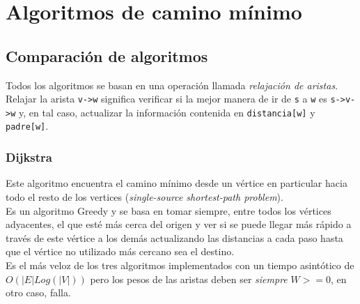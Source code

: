 \documentclass{article}
\def\code#1{\texttt{#1}}
\newcommand\tab[1][0.5cm]{\hspace*{#1}}
\begin{document}

    \newpage

    \section{Algoritmos de camino mínimo}
        \subsection{Comparación de algoritmos}
            \tab Todos los algoritmos se basan en una operación llamada \emph{relajación de aristas}. Relajar
        la arista \code{v->w} significa verificar si la mejor manera de ir de \code{s} a \code{w} es \code{s->v->w}
        y, en tal caso, actualizar la información contenida en \code{distancia[w]} y \code{padre[w]}.

            \subsubsection{Dijkstra}
            \tab Este algoritmo encuentra el camino mínimo desde un vértice en particular hacia todo
            el resto de los vertices (\emph{single-source shortest-path problem}). \\
            \tab Es un algoritmo Greedy y se basa en tomar siempre, entre todos los vértices adyacentes,
            el que esté más cerca del origen y ver si se puede llegar más rápido a través de este vértice a los demás
            actualizando las distancias a cada paso hasta que el vértice no utilizado más cercano sea el destino. \\
            \tab Es el más veloz de los tres algoritmos implementados con un tiempo asintótico de
            $O(|E|Log(|V|))$ pero los pesos de las aristas deben ser \emph{siempre} $W >= 0$, en otro caso, falla.
\end{document}

